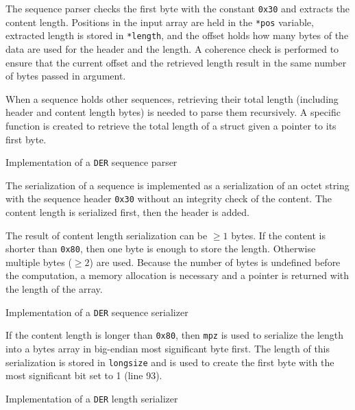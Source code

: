 The sequence parser checks the first byte with the constant \texttt{0x30} and
extracts the content length. Positions in the input array are held in the
\texttt{*pos} variable, extracted length is stored in \texttt{*length}, and the
offset holds how many bytes of the data are used for the header and the length.
A coherence check is performed to ensure that the current offset and the
retrieved length result in the same number of bytes passed in argument.

When a sequence holds other sequences, retrieving their total length (including
header and content length bytes) is needed to parse them recursively. A specific
function is created to retrieve the total length of a struct given a pointer to
its first byte.

\begin{listing}
	\caption{Implementation of a \texttt{DER} sequence parser}
	\label{lst:implDERSequenceParser}
\end{listing}

The serialization of a sequence is implemented as a serialization of an octet
string with the sequence header \texttt{0x30} without an integrity check of the
content. The content length is serialized first, then the header is added.

The result of content length serialization can be $\geq 1$ bytes. If the
content is shorter than \texttt{0x80}, then one byte is enough to store the
length. Otherwise multiple bytes ($\geq 2$) are used. Because the number of bytes is
undefined before the computation, a memory allocation is necessary and a pointer
is returned with the length of the array.

\begin{listing}
	\caption{Implementation of a \texttt{DER} sequence serializer}
	\label{lst:implDERSequenceSerializer}
\end{listing}

If the content length is longer than \texttt{0x80}, then \texttt{mpz} is used to
serialize the length into a bytes array in big-endian most significant byte
first. The length of this serialization is stored in \texttt{longsize} and is
used to create the first byte with the most significant bit set to 1 (line 93).

\begin{listing}
	\caption{Implementation of a \texttt{DER} length serializer}
	\label{lst:implDERLengthSerializer}
\end{listing}

